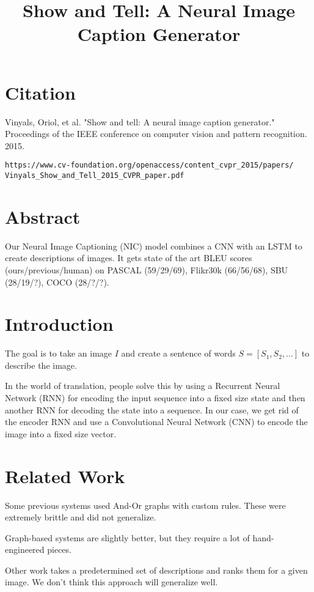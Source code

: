 \documentclass[a4paper]{article}
\title{Show and Tell: A Neural Image Caption Generator}
\date{}
\begin{document}
\maketitle

\section{Citation}
Vinyals, Oriol, et al. "Show and tell: A neural image caption generator." Proceedings of the IEEE conference on computer vision and pattern recognition. 2015.

\begin{verbatim}
https://www.cv-foundation.org/openaccess/content_cvpr_2015/papers/
Vinyals_Show_and_Tell_2015_CVPR_paper.pdf
\end{verbatim}

\section{Abstract}
Our Neural Image Captioning (NIC) model combines a CNN with an LSTM to create
descriptions of images. It gets state of the art BLEU scores
(ours/previous/human) on PASCAL (59/29/69), Flikr30k (66/56/68), SBU (28/19/?),
COCO (28/?/?).

\section{Introduction}
The goal is to take an image $I$ and create a sentence of words
$S = [S_1, S_2, ...]$ to describe the image.

In the world of translation, people solve this by using a Recurrent Neural
Network (RNN) for encoding the input sequence into a fixed size state and then
another RNN for decoding the state into a sequence. In our case, we get rid
of the encoder RNN and use a Convolutional Neural Network (CNN) to encode the
image into a fixed size vector.

\section{Related Work}
Some previous systems used And-Or graphs with custom rules. These were extremely
brittle and did not generalize.

Graph-based systems are slightly better, but they require a lot of
hand-engineered pieces.

Other work takes a predetermined set of descriptions and ranks them for a given
image. We don't think this approach will generalize well.
\end{document}

